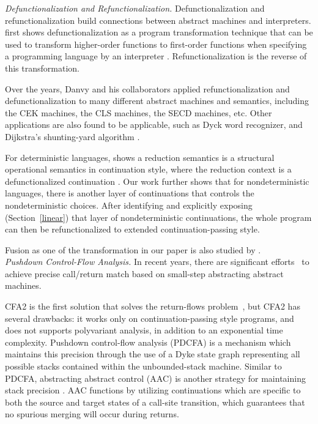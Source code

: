 \documentclass[acmsmall]{acmart}\settopmatter{}
\begin{document}
\textit{Defunctionalization and Refunctionalization.}
Defunctionalization and refunctionalization build connections between abstract
machines and interpreters.
\citeauthor{Reynolds:72} first shows defunctionalization as a program transformation 
technique that can be used to transform higher-order functions to first-order functions
when specifying a programming language by an interpreter \cite{Reynolds:72, Reynolds:HOSC98-revisited}.
Refunctionalization is the reverse of this transformation.

Over the years, Danvy and his collaborators applied refunctionalization and defunctionalization 
to many different abstract machines and semantics, including the CEK machines, the CLS machines,
the SECD machines, etc.
\cite{Ager:2003:FCE:888251.888254, Danvy:2001:DW:773184.773202, danvy2004refocusing, 
Danvy:2008:DIP:1411204.1411206, AGER2004223, ager2005functional, Danvy:2006:RW:2171265.2171268,
 danvy2009towards, biernacka2009towards}
Other applications are also found to be applicable, such as Dyck word recognizer, and 
Dijkstra's shunting-yard algorithm \cite{Danvy:2006:RW:2171265.2171268}.

For deterministic languages, \citeauthor{Danvy:2008:DIP:1411204.1411206} shows
a reduction semantics is a structural operational semantics in continuation style,
where the reduction context is a defunctionalized continuation \cite{Danvy:2008:DIP:1411204.1411206}.
Our work further shows that for nondeterministic languages, there is another layer of continuations
that controls the nondeterministic choices. After identifying and explicitly exposing 
(Section~\ref{linear}) that layer of nondeterministic continuations, the whole program can 
then be refunctionalized to extended continuation-passing style.

Fusion as one of the transformation in our paper is also studied by 
\citeauthor{Ohori:2007:LFF:1190216.1190241} \cite{Ohori:2007:LFF:1190216.1190241}. \\

\textit{Pushdown Control-Flow Analysis.}
In recent years, there are significant efforts~\cite{vardoulakis2010cfa2, earl2012introspective,
gilray2016pushdown, johnson2015abstracting} to achieve precise call/return
match based on small-step abstracting abstract machines.

CFA2 is the first solution that solves the return-flows problem~\cite{vardoulakis2010cfa2},
but CFA2 has several drawbacks: it works only on continuation-passing style programs,
and does not supports polyvariant analysis, in addition to an exponential time
complexity.
Pushdown control-flow analysis (PDCFA) is a mechanism which maintains this precision
through the use of a Dyke state graph representing all possible stacks contained
within the unbounded-stack machine\cite{earl2012introspective, earl2010pushdown}.
Similar to PDCFA, abstracting abstract control (AAC) is another strategy for
maintaining stack precision \cite{johnson2015abstracting}.
AAC functions by utilizing continuations which are specific to both
the source and target states of a call-site transition,
which guarantees that no spurious merging will occur during returns.
\end{document}
